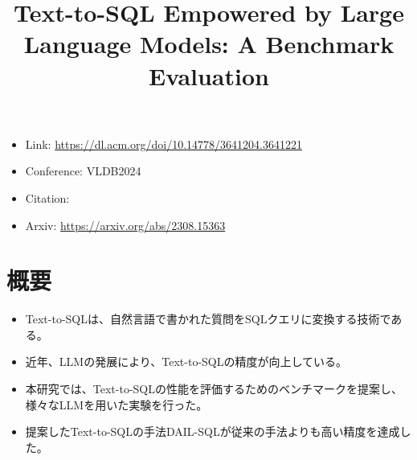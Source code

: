 \documentclass[dvipdfmx,uplatex]{jsarticle}
\title{Text-to-SQL Empowered by Large Language Models: A
Benchmark Evaluation}
\author{\empty}
\date{\empty}
\theoremstyle{remark}
\newenvironment{simplebox}{
    \begin{tcolorbox}[
        fonttitle=\bfseries,
    ]
}{
    \end{tcolorbox}
}
\begin{document}
\maketitle

\begin{itemize}
    \item Link: \url{https://dl.acm.org/doi/10.14778/3641204.3641221}
    \item Conference: VLDB2024
    \item Citation: \cite{text2sql_benchmark}
    \item Arxiv: \url{https://arxiv.org/abs/2308.15363}
\end{itemize}


\section{概要}
\begin{simplebox}
\begin{itemize}
    \item Text-to-SQLは、自然言語で書かれた質問をSQLクエリに変換する技術である。
    \item 近年、LLMの発展により、Text-to-SQLの精度が向上している。
    \item 本研究では、Text-to-SQLの性能を評価するためのベンチマークを提案し、様々なLLMを用いた実験を行った。
    \item 提案したText-to-SQLの手法DAIL-SQLが従来の手法よりも高い精度を達成した。
\end{itemize}
\end{simplebox}



\end{document}
